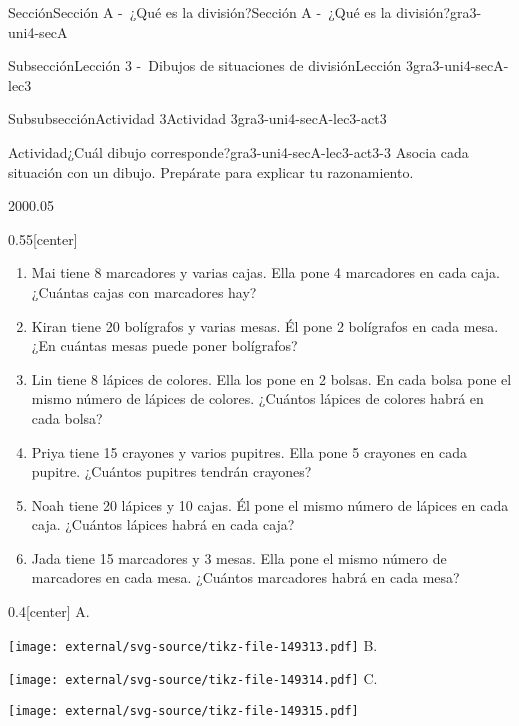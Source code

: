 \documentclass[twoside,10pt,]{article}
\begin{document}
\begin{sectionptx}{Sección}{Sección A -~¿Qué es la división?}{}{Sección A -~¿Qué es la división?}{}{}{gra3-uni4-secA}
\begin{subsectionptx}{Subsección}{Lección 3 -~Dibujos de situaciones de división}{}{Lección 3}{}{}{gra3-uni4-secA-lec3}
\typeout{************************************************}
%
\begin{subsubsectionptx}{Subsubsección}{Actividad 3}{}{Actividad 3}{}{}{gra3-uni4-secA-lec3-act3}
\begin{activity}{Actividad}{¿Cuál dibujo corresponde?}{gra3-uni4-secA-lec3-act3-3}%
Asocia cada situación con un dibujo. Prepárate para explicar tu razonamiento.%
\begin{sidebyside}{2}{0}{0}{0.05}%
\begin{sbspanel}{0.55}[center]%
%
\begin{enumerate}
\item{}Mai tiene 8 marcadores y varias cajas. Ella pone 4 marcadores en cada caja. ¿Cuántas cajas con marcadores hay?%
\item{}Kiran tiene 20 bolígrafos y varias mesas. Él pone 2 bolígrafos en cada mesa. ¿En cuántas mesas puede poner bolígrafos?%
\item{}Lin tiene 8 lápices de colores. Ella los pone en 2 bolsas. En cada bolsa pone el mismo número de lápices de colores. ¿Cuántos lápices de colores habrá en cada bolsa?%
\item{}Priya tiene 15 crayones y varios pupitres. Ella pone 5 crayones en cada pupitre. ¿Cuántos pupitres tendrán crayones?%
\item{}Noah tiene 20 lápices y 10 cajas. Él pone el mismo número de lápices en cada caja. ¿Cuántos lápices habrá en cada caja?%
\item{}Jada tiene 15 marcadores y 3 mesas. Ella pone el mismo número de marcadores en cada mesa. ¿Cuántos marcadores habrá en cada mesa?%
\end{enumerate}
\end{sbspanel}%
\begin{sbspanel}{0.4}[center]%
A.%
\par
\texttt{[image: external/svg-source/tikz-file-149313.pdf]}
B.%
\par
\texttt{[image: external/svg-source/tikz-file-149314.pdf]}
C.%
\par
\texttt{[image: external/svg-source/tikz-file-149315.pdf]}
\end{sbspanel}%
\end{sidebyside}%
\end{activity}%
\end{subsubsectionptx}
%
%
\typeout{************************************************}
\typeout{************************************************}

\end{subsectionptx}
\end{sectionptx}
\end{document}
